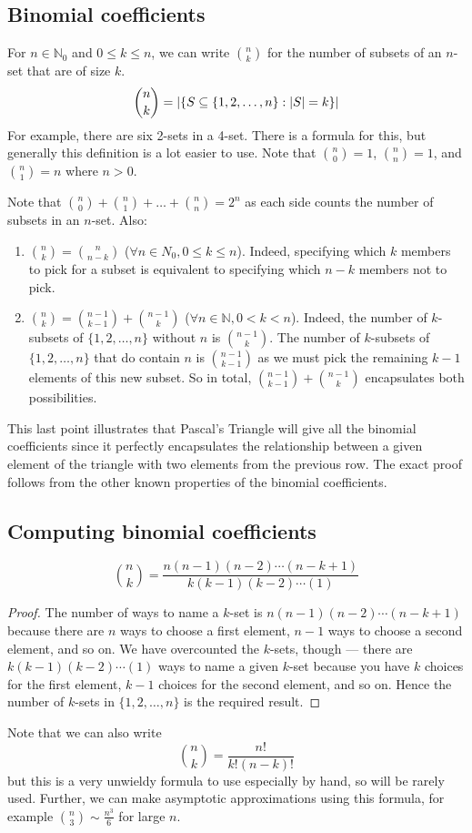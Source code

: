 \subsection{Binomial coefficients}
For \(n \in \mathbb N_0\) and \(0 \leq k \leq n\), we can write \(\binom{n}{k}\) for the number of subsets of an \(n\)-set that are of size \(k\).
\[
	\binom{n}{k} = \abs{\left\{ S \subseteq \{ 1, 2, \dots, n \}: \abs{S} = k \right\}}
\]
For example, there are six 2-sets in a 4-set.
There is a formula for this, but generally this definition is a lot easier to use.
Note that \(\binom{n}{0} = 1\), \(\binom{n}{n} = 1\), and \(\binom{n}{1}=n\) where \(n>0\).

Note that \(\binom{n}{0} + \binom{n}{1} + \dots + \binom{n}{n} = 2^n\) as each side counts the number of subsets in an \(n\)-set.
Also:
\begin{enumerate}
	\item \(\binom{n}{k} = \binom{n}{n-k}\) (\(\forall n \in N_0, 0 \leq k \leq n\)).
	      Indeed, specifying which \(k\) members to pick for a subset is equivalent to specifying which \(n-k\) members not to pick.
	\item \(\binom{n}{k} = \binom{n-1}{k-1} + \binom{n-1}{k}\) (\(\forall n \in \mathbb N, 0 < k < n\)).
	      Indeed, the number of \(k\)-subsets of \(\{ 1, 2, \dots, n \}\) without \(n\) is \(\binom{n-1}{k}\).
	      The number of \(k\)-subsets of \(\{ 1, 2, \dots, n \}\) that do contain \(n\) is \(\binom{n-1}{k-1}\) as we must pick the remaining \(k-1\) elements of this new subset.
	      So in total, \(\binom{n-1}{k-1} + \binom{n-1}{k}\) encapsulates both possibilities.
\end{enumerate}
This last point illustrates that Pascal's Triangle will give all the binomial coefficients since it perfectly encapsulates the relationship between a given element of the triangle with two elements from the previous row.
The exact proof follows from the other known properties of the binomial coefficients.

\subsection{Computing binomial coefficients}
\begin{proposition}
	\[
		\binom{n}{k} = \frac{n(n-1)(n-2)\cdots(n-k+1)}{k(k-1)(k-2)\cdots(1)}
	\]
\end{proposition}
\begin{proof}
	The number of ways to name a \(k\)-set is \(n(n-1)(n-2)\cdots(n-k+1)\) because there are \(n\) ways to choose a first element, \(n-1\) ways to choose a second element, and so on.
	We have overcounted the \(k\)-sets, though --- there are \(k(k-1)(k-2)\cdots(1)\) ways to name a given \(k\)-set because you have \(k\) choices for the first element, \(k-1\) choices for the second element, and so on.
	Hence the number of \(k\)-sets in \(\{ 1, 2, \dots, n \}\) is the required result.
\end{proof}
Note that we can also write
\[
	\binom{n}{k} = \frac{n!}{k!(n-k)!}
\]
but this is a very unwieldy formula to use especially by hand, so will be rarely used.
Further, we can make asymptotic approximations using this formula, for example \(\binom{n}{3} \sim \frac{n^3}{6}\) for large \(n\).

